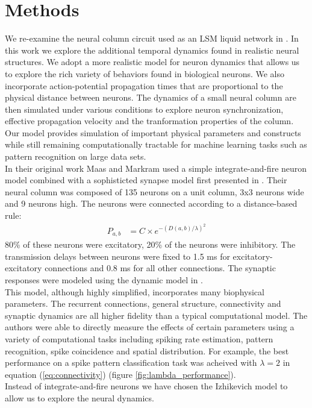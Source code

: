 \documentclass[a4paper,11pt]{article}
\begin{document}
\section{Methods}
We re-examine the neural column circuit used as an LSM liquid network in \cite{maas2002}.
In this work we explore the additional temporal dynamics found in realistic neural structures.
We adopt a more realistic model for neuron dynamics that allows us to explore the rich variety of behaviors found in biological neurons.
We also incorporate action-potential propagation times that are proportional to the physical distance between neurons.
The dynamics of a small neural column are then simulated under various conditions to explore neuron synchronization, effective propagation velocity and the tranformation properties of the column.
Our model provides simulation of important physical parameters and constructs while still remaining computationally tractable for machine learning tasks such as pattern recognition on large data sets.
\\
In their original work Maas and Markram used a simple integrate-and-fire neuron model combined with a sophisticted synapse model first presented in \cite{markram1998}.
Their neural column was composed of 135 neurons on a unit column, 3x3 neurons wide and 9 neurons high.
The neurons were connected according to a distance-based rule:
\begin{align}\label{eq:connectivity}
 P_{a,b} &= C \times e^{-(D(a,b)/\lambda)^2}
\end{align}
80\% of these neurons were excitatory, 20\% of the neurons were inhibitory. 
The transmission delays between neurons were fixed to 1.5 ms for excitatory-excitatory connections and 0.8 ms for all other connections.
The synaptic responses were modeled using the dynamic model in \cite{markram1998}. \\
This model, although highly simplified, incorporates many biophysical parameters.
The recurrent connections, general structure, connectivity and synaptic dynamics are all higher fidelity than a typical computational model.
The authors were able to directly measure the effects of certain parameters using a variety of computational tasks including spiking rate estimation, pattern recognition, spike coincidence and spatial distribution. 
For example, the best performance on a spike pattern classification task was acheived with $\lambda=2$ in equation (\ref{eq:connectivity}) (figure \ref{fig:lambda_performance}).
\\
Instead of integrate-and-fire neurons we have chosen the Izhikevich model \cite{izhikevich2003} to allow us to explore the neural dynamics.
\end{document}
